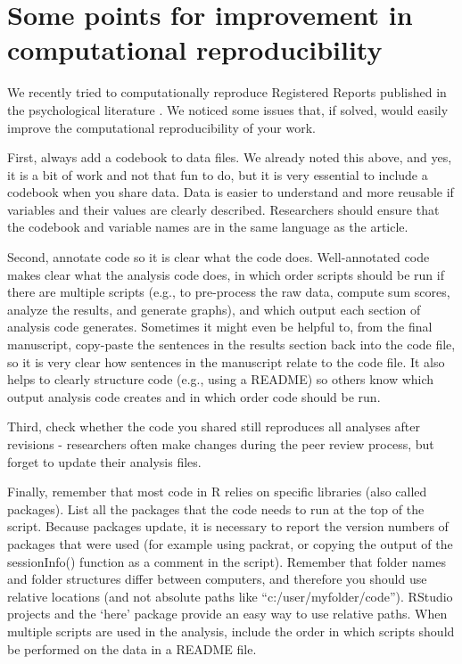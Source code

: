 \documentclass[
  oneside]{krantz}
\begin{document}
\hypertarget{some-points-for-improvement-in-computational-reproducibility}{%
\section{Some points for improvement in computational reproducibility}\label{some-points-for-improvement-in-computational-reproducibility}}

We recently tried to computationally reproduce Registered Reports published in the psychological literature \citep{obels_analysis_2020}. We noticed some issues that, if solved, would easily improve the computational reproducibility of your work.

First, always add a codebook to data files. We already noted this above, and yes, it is a bit of work and not that fun to do, but it is very essential to include a codebook when you share data. Data is easier to understand and more reusable if variables and their values are clearly described. Researchers should ensure that the codebook and variable names are in the same language as the article.

Second, annotate code so it is clear what the code does. Well-annotated code makes clear what the analysis code does, in which order scripts should be run if there are multiple scripts (e.g., to pre-process the raw data, compute sum scores, analyze the results, and generate graphs), and which output each section of analysis code generates. Sometimes it might even be helpful to, from the final manuscript, copy-paste the sentences in the results section back into the code file, so it is very clear how sentences in the manuscript relate to the code file. It also helps to clearly structure code (e.g., using a README) so others know which output analysis code creates and in which order code should be run.

Third, check whether the code you shared still reproduces all analyses after revisions - researchers often make changes during the peer review process, but forget to update their analysis files.

Finally, remember that most code in R relies on specific libraries (also called packages). List all the packages that the code needs to run at the top of the script. Because packages update, it is necessary to report the version numbers of packages that were used (for example using packrat, or copying the output of the sessionInfo() function as a comment in the script). Remember that folder names and folder structures differ between computers, and therefore you should use relative locations (and not absolute paths like ``c:/user/myfolder/code''). RStudio projects and the `here' package provide an easy way to use relative paths. When multiple scripts are used in the analysis, include the order in which scripts should be performed on the data in a README file.
\end{document}

